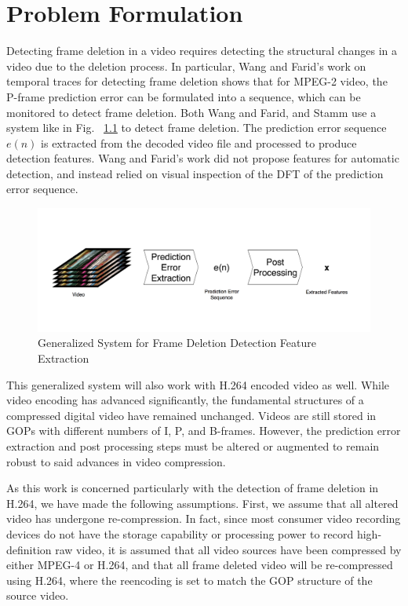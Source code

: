 \chapter{Problem Formulation}

Detecting frame deletion in a video requires detecting the structural changes in a video due to the deletion process. In particular, Wang and Farid's work on temporal traces for detecting frame deletion shows that for MPEG-2 video, the P-frame prediction error can be formulated into a sequence, which can be monitored to detect frame deletion. Both Wang and Farid, and Stamm use a system like in Fig. ~\ref{System} to detect frame deletion. The prediction error sequence $e(n)$ is extracted from the decoded video file and processed to produce detection features. Wang and Farid's work did not propose features for automatic detection, and instead relied on visual inspection of the DFT of the prediction error sequence.

\begin{figure}[htbp]
\centerline{\includegraphics[width=0.9\linewidth]{ProblemFormulation/frame_deletion_detection_system.png}}
\caption{Generalized System for Frame Deletion Detection Feature Extraction}
\label{System}
\end{figure}

This generalized system will also work with H.264 encoded video as well. While video encoding has advanced significantly, the fundamental structures of a compressed digital video have remained unchanged. Videos are still stored in GOPs with different numbers of I, P, and B-frames. However, the prediction error extraction and post processing steps must be altered or augmented to remain robust to said advances in video compression.

As this work is concerned particularly with the detection of frame deletion in H.264, we have made the following assumptions. First, we assume that all altered video has undergone re-compression. In fact, since most consumer video recording devices do not have the storage capability or processing power to record high-definition raw video, it is assumed that all video sources have been compressed by either MPEG-4 or H.264, and that all frame deleted video will be re-compressed using H.264, where the reencoding is set to match the GOP structure of the source video. 


